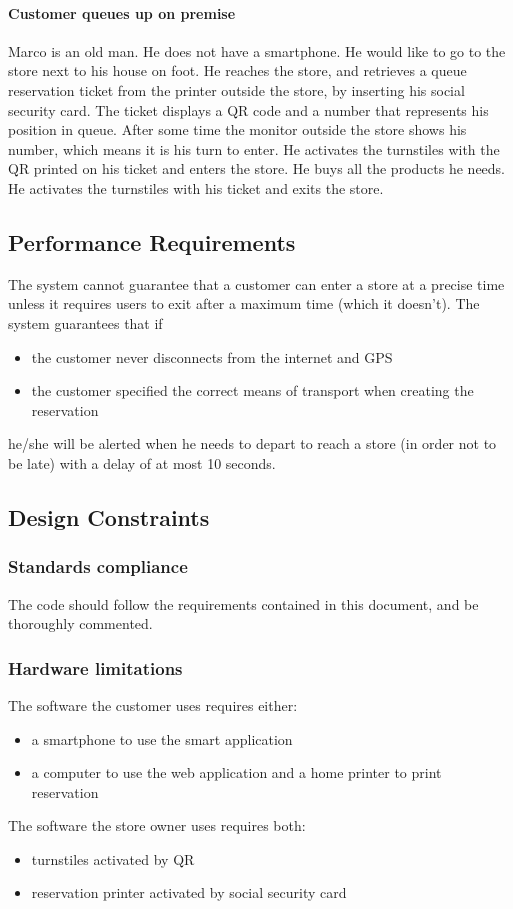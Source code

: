 \paragraph{Customer queues up on premise}
Marco is an old man. He does not have a smartphone. He would like to go to the store next to his house on foot. He reaches the store, and retrieves a queue reservation ticket from the printer outside the store, by inserting his social security card. The ticket displays a QR code and a number that represents his position in queue. After some time the monitor outside the store shows his number, which means it is his turn to enter. He activates the turnstiles with the QR printed on his ticket and enters the store. He buys all the products he needs. He activates the turnstiles with his ticket and exits the store.
\subsection{Performance Requirements}
The system cannot guarantee that a customer can enter a store at a precise time unless it requires users to exit after a maximum time (which it doesn't).
The system guarantees that if
\begin{itemize}
	\item the customer never disconnects from the internet and GPS
	\item the customer specified the correct means of transport when creating the reservation
\end{itemize}
 he/she will be alerted when he needs to depart to reach a store (in order not to be late) with a delay of at most 10 seconds.
\subsection{Design Constraints}
\subsubsection{Standards compliance}
The code should follow the requirements contained in this document, and be thoroughly commented.
\subsubsection{Hardware limitations}
The software the customer uses requires either:
\begin{itemize}
	\item a smartphone to use the smart application
	\item a computer to use the web application and a home printer to print reservation
\end{itemize}
The software the store owner uses requires both:
\begin{itemize}
	\item turnstiles activated by QR
	\item reservation printer activated by social security card
\end{itemize}
